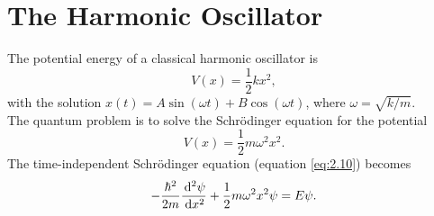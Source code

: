 \documentclass[en, oneside]{vivi}
\begin{document}
\section{The Harmonic Oscillator}
The potential energy of a classical harmonic oscillator is
\begin{equation}
    V(x) = \frac{1}{2} k x^2,
\end{equation}
with the solution $x(t) = A \sin(\omega t) + B \cos(\omega t)$, where $\omega = \sqrt{k/m}$.\\
The quantum problem is to solve the Schrödinger equation for the potential
\begin{equation}
    V(x) = \frac{1}{2} m \omega^2 x^2.
\end{equation}
The time-independent Schrödinger equation (equation \eqref{eq:2.10}) becomes
\begin{equation} \label{eq:harmonic oscillator}
    -\frac{\hbar^2}{2m} \frac{\dif[2] \psi}{\dif x^2} + \frac{1}{2} m \omega^2 x^2 \psi = E\psi.
\end{equation}
\end{document}

